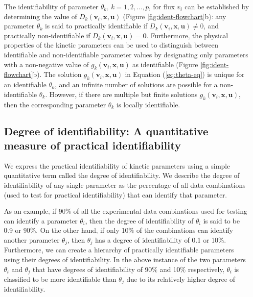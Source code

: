 \documentclass[10pt]{article}
\begin{document}
	The identifiability of parameter $\theta_k$, $k = {1, 2, ..., p}$, for flux $v_i$ can be established by determining the value of $D_k(\mathbf{v}_i, \mathbf{x}, \mathbf{u})$ (Figure \ref{fig:ident-flowchart}b): any parameter $\theta_k$ is said to practically identifiable if $D_k(\mathbf{v}_i, \mathbf{x}, \mathbf{u})\neq0$, and practically non-identifiable if $D_k(\mathbf{v}_i, \mathbf{x}, \mathbf{u}) = 0$. Furthermore, the physical properties of the kinetic parameters can be used to distinguish between identifiable and non-identifiable parameter values by designating only parameters with a non-negative value of $g_k(\mathbf{v}_i, \mathbf{x}, \mathbf{u})$ as identifiable (Figure \ref{fig:ident-flowchart}b). The solution $g_k(\mathbf{v}_i, \mathbf{x}, \mathbf{u})$ in Equation (\ref{eq:theta-eq}) is unique for an identifiable $\theta_k$, and an infinite number of solutions are possible for a non-identifiable $\theta_k$. However, if there are multiple but finite solutions $g_k(\mathbf{v}_i, \mathbf{x}, \mathbf{u})$, then the corresponding parameter $\theta_k$ is locally identifiable.
	
	
	\subsection{Degree of identifiability: A quantitative measure of practical identifiability}\label{sec:degree_of_identifiability}
	We express the practical identifiability of kinetic parameters using a simple quantitative term called the degree of identifiability. We describe the degree of identifiability of any single parameter as the percentage of all data combinations (used to test for practical identifiability) that can identify that parameter. 
	
	As an example, if 90\% of all the experimental data combinations used for testing can identify a parameter $\theta_i$, then the degree of identifiability of $\theta_i$ is said to be 0.9 or 90\%. On the other hand, if only 10\% of the combinations can identify another parameter $\theta_j$, then $\theta_j$ has a degree of identifiability of 0.1 or 10\%. Furthermore, we can create a hierarchy of practically identifiable parameters using their degrees of identifiability. In the above instance of the two parameters $\theta_i$ and $\theta_j$ that have degrees of identifiability of 90\% and 10\% respectively, $\theta_i$ is classified to be more identifiable than $\theta_j$ due to its relatively higher degree of identifiability. 
	
\end{document}
